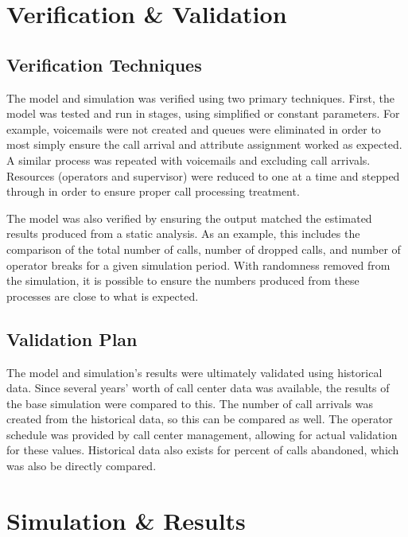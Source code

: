 \documentclass[12pt]{article}
\begin{document}
\section{Verification \& Validation}

	\subsection{Verification Techniques}

The model and simulation was verified using two primary techniques.  First, the model was tested and run in stages, using simplified or constant parameters.  For example, voicemails were not created and queues were eliminated in order to most simply ensure the call arrival and attribute assignment worked as expected.  A similar process was repeated with voicemails and excluding call arrivals.  Resources (operators and supervisor) were reduced to one at a time and stepped through in order to ensure proper call processing treatment.  

\par

The model was also verified by ensuring the output matched the estimated results produced from a static analysis.  As an example, this includes the comparison of the total number of calls, number of dropped calls, and number of operator breaks for a given simulation period.  With randomness removed from the simulation, it is possible to ensure the numbers produced from these processes are close to what is expected.
	
	
	\subsection{Validation Plan}
	
The model and simulation's results were ultimately validated using historical data.  Since several years' worth of call center data was available, the results of the base simulation were compared to this.  The number of call arrivals was created from the historical data, so this can be compared as well.  The operator schedule was provided by call center management, allowing for actual validation for these values.  Historical data also exists for percent of calls abandoned, which was also be directly compared.
	

\section{Simulation \& Results}
\end{document}
